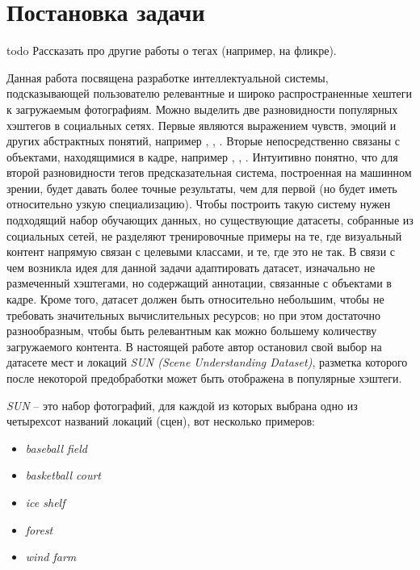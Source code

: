 \section{Постановка задачи}

todo Рассказать про другие работы о тегах (например, на фликре).

\indent
\indent
Данная работа посвящена разработке интеллектуальной системы, 
подсказывающей пользователю релевантные и широко распространенные
хештеги к загружаемым фотографиям.
Можно выделить две разновидности популярных хэштегов в социальных сетях.
Первые являются выражением чувств, эмоций и других абстрактных понятий,
например , , . Вторые непосредственно
связаны с объектами, находящимися в кадре, например  
, , . 
Интуитивно понятно, что для второй разновидности
тегов предсказательная система, построенная на машинном зрении, будет
давать более точные результаты, чем для первой (но будет
иметь относительно узкую специализацию). Чтобы построить такую систему
нужен подходящий набор обучающих данных, но существующие датасеты, 
собранные из социальных сетей, не разделяют тренировочные примеры на те, 
где визуальный контент напрямую связан с целевыми классами, и те, где это не так.
В связи с чем возникла идея для данной задачи 
адаптировать датасет, изначально не размеченный
хэштегами, но содержащий аннотации, связанные с объектами
 в кадре. Кроме того, датасет должен быть относительно небольшим,
чтобы не требовать значительных 
вычислительных ресурсов; но при этом достаточно разнообразным, чтобы 
быть релевантным как можно большему количеству загружаемого контента.
В настоящей работе автор остановил свой выбор на датасете мест и локаций 
 \textit{SUN\cite{sundata} (Scene Understanding Dataset)}, 
 разметка которого после некоторой предобработки может быть отображена в популярные хэштеги.


\indent  
\textit{SUN} -- это набор фотографий, для каждой из которых выбрана одно
  из четырехсот названий локаций (сцен), вот несколько примеров:
  
  
\begin{itemize}
    \item \textit{baseball field}
    \item \textit{basketball court}
    \item \textit{ice shelf}
    \item \textit{forest}
    \item \textit{wind farm}
\end{itemize}



